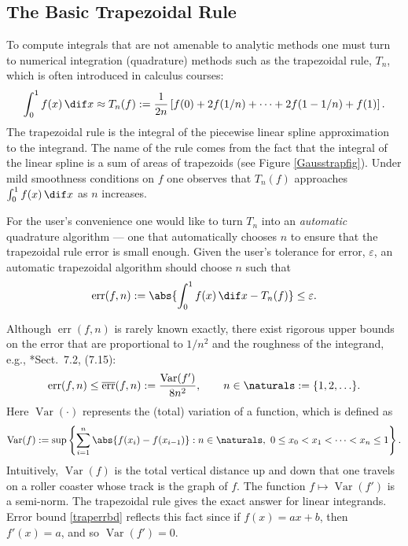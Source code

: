 \documentclass[]{amsart}
\DeclareMathOperator{\Var}{Var}
\DeclareMathOperator{\err}{err}
\newcommand{\oerr}{\overline{\err}}
\theoremstyle{definition}
\theoremstyle{remark}
\begin{document}
\subsection{The Basic Trapezoidal Rule}
To compute integrals that are not amenable to analytic methods one must turn to numerical integration (quadrature) methods such as the trapezoidal rule, $T_n$, which is often introduced in calculus courses:
\begin{equation}
\int_0^1 f(x) \, \dif x \approx T_n(f) := \frac{1}{2n} \left [ f(0) + 2 f(1/n) + \cdots + 2 f(1-1/n) + f(1) \right].
\end{equation}
The trapezoidal rule is the integral of the piecewise linear spline approximation to the integrand.  The name of the rule comes from the fact that the integral of the linear spline is a sum of areas of trapezoids (see Figure \ref{Gausstrapfig}). Under mild smoothness conditions on $f$ one observes that $T_n(f)$ approaches $\int_0^1 f(x) \, \dif x$ as $n$ increases. 

For the user's convenience one would like to turn $T_n$ into an \emph{automatic} quadrature algorithm --- one that automatically chooses $n$ to ensure that the trapezoidal rule error is small enough.  Given the user's tolerance for error, $\varepsilon$, an automatic trapezoidal algorithm should choose $n$ such that 
\begin{equation} \label{errdef}
\err(f,n) := \abs{\int_0^1 f(x) \, \dif x - T_n(f)} \le \varepsilon.
\end{equation}

Although $\err(f,n)$ is rarely known exactly, there exist rigorous upper bounds on the error that are proportional to $1/n^2$ and the roughness of the integrand, e.g., *{Sect.\ 7.2, (7.15)}: 
\begin{equation} \label{traperrbd}
\err(f,n) \le \oerr(f,n):=\frac{\Var(f')}{8n^2}, \qquad n \in \naturals := \{1, 2, \ldots \}. 
\end{equation}
Here $\Var(\cdot)$ represents the (total) variation of a function, which is defined as
\begin{equation} \label{vardef}
\Var(f) := \sup \left \{ \sum_{i=1}^n \abs{f(x_i)-f(x_{i-1})} : n \in \naturals, \ 0 \le x_0 < x_1 < \cdots < x_{n} \le 1 \right\}.
\end{equation}
Intuitively, $\Var(f)$ is the total vertical distance up and down that one travels on a roller coaster whose track is the graph of $f$. The function $f \mapsto \Var(f')$ is a semi-norm. The trapezoidal rule gives the exact answer for linear integrands.  Error bound \eqref{traperrbd} reflects this fact since if $f(x)=ax+b$, then $f'(x)=a$, and so $\Var(f')=0$.
\end{document}
